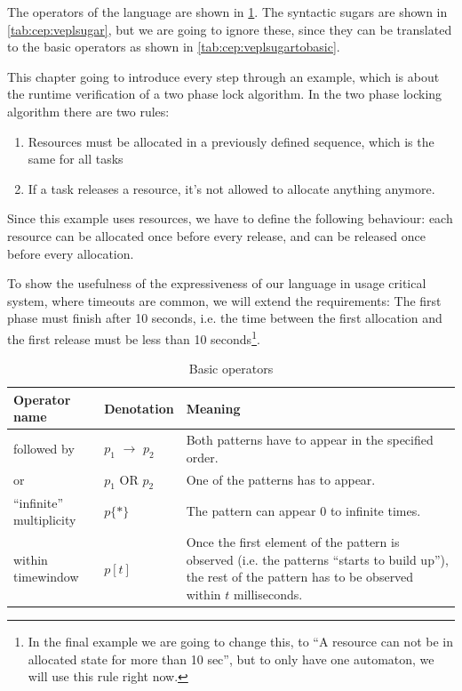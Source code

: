 		
		The operators of the language are shown in \cref{tab:cep:veplop}. 
		The syntactic sugars are shown in \cref{tab:cep:veplsugar},
		but we are going to ignore these, since they can be translated to the basic operators as shown in \cref{tab:cep:veplsugartobasic}.
		
		This chapter going to introduce every step through an example, which is about the runtime verification of a two phase lock algorithm. %
		In the two phase locking algorithm there are two rules:
		\begin{enumerate}
			\item Resources must be allocated in a previously defined sequence, which is the same for all tasks
			\item If a task releases a resource, it's not allowed to allocate anything anymore.
		\end{enumerate}
		
		Since this example uses resources, we have to define the following behaviour:
		each resource can be allocated once before every release, and can be released once before every allocation.
		
		To show the usefulness of the expressiveness of our language in usage critical system, where timeouts are common, we will extend the requirements:
		The first phase must finish after 10 seconds,
		i.e. the time between the first allocation and the first release must be less than 10 seconds\footnote{In the final 
		example we are going to change this, to ``A resource can not be in allocated state for more than 10 sec'', but to 
		only have one automaton, we will use this rule right now.}.
		
			
		\begin{table}
		\caption{Basic operators}		
		\label{tab:cep:veplop}
			\begin{tabularx}{\textwidth}{llX}
				\toprule
				Operator name &	Denotation & Meaning \\
				\midrule
				followed by & $p_1$ $\rightarrow$ $p_2$ & Both patterns have to appear in the specified order. \\
				or & $p_1$ OR $p_2$ &	One of the patterns has to appear. \\
				``infinite'' multiplicity & $p\{\ast\}$ & The pattern can appear 0 to infinite times. \\
				within timewindow &	$p[t]$ & Once the first element of the pattern is observed (i.e. the patterns ``starts to build up''), the rest of the pattern has to be observed within $t$ milliseconds. \\
				\bottomrule
			\end{tabularx}
		\end{table}

